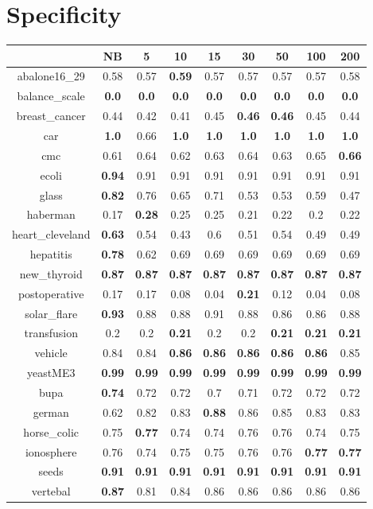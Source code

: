 \documentclass{article}%
\begin{document}
%
\section*{Specificity}%
\begin{tabular}{c|cccccccc}%
\hline%
&NB&5&10&15&30&50&100&200\\%
\hline%
abalone16\_29&0.58&0.57&\textbf{0.59}&0.57&0.57&0.57&0.57&0.58\\%
\hline%
balance\_scale&\textbf{0.0}&\textbf{0.0}&\textbf{0.0}&\textbf{0.0}&\textbf{0.0}&\textbf{0.0}&\textbf{0.0}&\textbf{0.0}\\%
\hline%
breast\_cancer&0.44&0.42&0.41&0.45&\textbf{0.46}&\textbf{0.46}&0.45&0.44\\%
\hline%
car&\textbf{1.0}&0.66&\textbf{1.0}&\textbf{1.0}&\textbf{1.0}&\textbf{1.0}&\textbf{1.0}&\textbf{1.0}\\%
\hline%
cmc&0.61&0.64&0.62&0.63&0.64&0.63&0.65&\textbf{0.66}\\%
\hline%
ecoli&\textbf{0.94}&0.91&0.91&0.91&0.91&0.91&0.91&0.91\\%
\hline%
glass&\textbf{0.82}&0.76&0.65&0.71&0.53&0.53&0.59&0.47\\%
\hline%
haberman&0.17&\textbf{0.28}&0.25&0.25&0.21&0.22&0.2&0.22\\%
\hline%
heart\_cleveland&\textbf{0.63}&0.54&0.43&0.6&0.51&0.54&0.49&0.49\\%
\hline%
hepatitis&\textbf{0.78}&0.62&0.69&0.69&0.69&0.69&0.69&0.69\\%
\hline%
new\_thyroid&\textbf{0.87}&\textbf{0.87}&\textbf{0.87}&\textbf{0.87}&\textbf{0.87}&\textbf{0.87}&\textbf{0.87}&\textbf{0.87}\\%
\hline%
postoperative&0.17&0.17&0.08&0.04&\textbf{0.21}&0.12&0.04&0.08\\%
\hline%
solar\_flare&\textbf{0.93}&0.88&0.88&0.91&0.88&0.86&0.86&0.88\\%
\hline%
transfusion&0.2&0.2&\textbf{0.21}&0.2&0.2&\textbf{0.21}&\textbf{0.21}&\textbf{0.21}\\%
\hline%
vehicle&0.84&0.84&\textbf{0.86}&\textbf{0.86}&\textbf{0.86}&\textbf{0.86}&\textbf{0.86}&0.85\\%
\hline%
yeastME3&\textbf{0.99}&\textbf{0.99}&\textbf{0.99}&\textbf{0.99}&\textbf{0.99}&\textbf{0.99}&\textbf{0.99}&\textbf{0.99}\\%
\hline%
bupa&\textbf{0.74}&0.72&0.72&0.7&0.71&0.72&0.72&0.72\\%
\hline%
german&0.62&0.82&0.83&\textbf{0.88}&0.86&0.85&0.83&0.83\\%
\hline%
horse\_colic&0.75&\textbf{0.77}&0.74&0.74&0.76&0.76&0.74&0.75\\%
\hline%
ionosphere&0.76&0.74&0.75&0.75&0.76&0.76&\textbf{0.77}&\textbf{0.77}\\%
\hline%
seeds&\textbf{0.91}&\textbf{0.91}&\textbf{0.91}&\textbf{0.91}&\textbf{0.91}&\textbf{0.91}&\textbf{0.91}&\textbf{0.91}\\%
\hline%
vertebal&\textbf{0.87}&0.81&0.84&0.86&0.86&0.86&0.86&0.86\\%
\hline%
\end{tabular}
\end{document}
